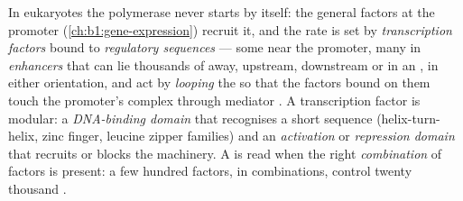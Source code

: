 \begin{definition}\label{def:b1:expression-control:enhancer}
In eukaryotes the polymerase never starts by itself: the general
factors at the promoter (\cref{ch:b1:gene-expression}) recruit it, and
the rate is set by \emph{transcription factors} bound to
\emph{regulatory sequences} --- some near the promoter, many in
\emph{enhancers} that can lie thousands of  away, upstream,
downstream or in an , in either orientation, and act by
\emph{looping} the  so that the factors bound on them touch the
promoter's complex through mediator . A transcription factor
is modular: a \emph{DNA-binding domain} that recognises a short
sequence (helix-turn-helix, zinc finger, leucine zipper families)
and an \emph{activation} or \emph{repression domain} that recruits or
blocks the machinery. A  is read when the right \emph{combination}
of factors is present: a few hundred factors, in combinations, control
twenty thousand .
\end{definition}

